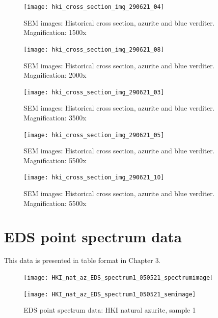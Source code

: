 \begin{figure}[H]
\centering
  \texttt{[image: hki\_cross\_section\_img\_290621\_04]}
\caption[SEM images: Historical cross section, azurite and blue verditer]{SEM images: Historical cross section, azurite and blue verditer. Magnification: 1500x}
\label{fig:xsection_dept_4}
\end{figure}


\begin{figure}[H]
\centering
  \texttt{[image: hki\_cross\_section\_img\_290621\_08]}
\caption[SEM images: Historical cross section, azurite and blue verditer]{SEM images: Historical cross section, azurite and blue verditer. Magnification: 2000x}
\label{fig:xsection_dept_5}
\end{figure}

\begin{figure}[H]
\centering
  \texttt{[image: hki\_cross\_section\_img\_290621\_03]}
\caption[SEM images: Historical cross section, azurite and blue verditer]{SEM images: Historical cross section, azurite and blue verditer. Magnification: 3500x}
\label{fig:xsection_dept_6}
\end{figure}

\begin{figure}[H]
\centering
  \texttt{[image: hki\_cross\_section\_img\_290621\_05]}
\caption[SEM images: Historical cross section, azurite and blue verditer]{SEM images: Historical cross section, azurite and blue verditer. Magnification: 5500x}
\label{fig:xsection_dept_7}
\end{figure}

\begin{figure}[H]
\centering
  \texttt{[image: hki\_cross\_section\_img\_290621\_10]}
\caption[SEM images: Historical cross section, azurite and blue verditer]{SEM images: Historical cross section, azurite and blue verditer. Magnification: 5500x}
\label{fig:xsection_dept_8}
\end{figure}



\section{EDS point spectrum data}

This data is presented in table format in Chapter 3.


\begin{figure}[H]
\centering
\begin{minipage}{.45\textwidth}
  \centering
  \texttt{[image: HKI\_nat\_az\_EDS\_spectrum1\_050521\_spectrumimage]}
\end{minipage}
\begin{minipage}{.45\textwidth}
  \centering
  \texttt{[image: HKI\_nat\_az\_EDS\_spectrum1\_050521\_semimage]}
\end{minipage}
\caption[EDS point spectrum data: HKI natural azurite, sample 1]{EDS point spectrum data: HKI natural azurite, sample 1}
\label{fig:hki_point_eds_1}
\end{figure}

